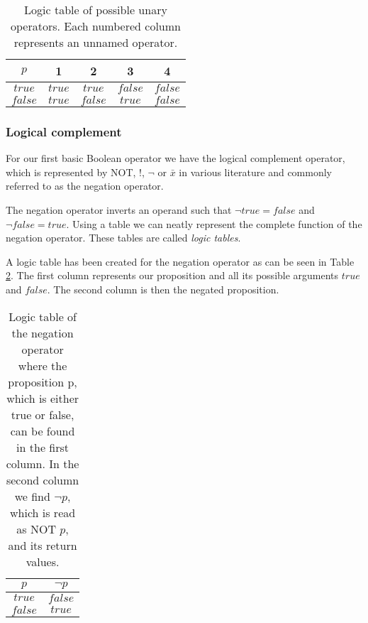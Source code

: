             \begin{table}[h!]
                \centering
                \begin{tabular}{|c||c|c|c|c|}
                	\hline
                	  $p$   &   1    &    2    &    3    & 4       \\ \hline
                	$true$  & $true$ & $true$  & $false$ & $false$ \\ \hline
                	$false$ & $true$ & $false$ & $true$  & $false$ \\ \hline
                \end{tabular}
                \caption{Logic table of possible unary operators. Each numbered column represents an unnamed operator.}
                \label{LogicTable:unary}
            \end{table} 
        
            \subsubsection{Logical complement}
            
                For our first basic Boolean operator we have the logical complement operator, which is represented by NOT, !, $\neg$ or $\bar{x}$ in various literature and commonly referred to as the negation operator. 
                
                The negation operator inverts an operand such that $\neg true = false$ and $\neg false = true$.
                Using a table we can neatly represent the complete function of the negation operator. These tables are called \textit{logic tables}.
                
                A logic table has been created for the negation operator as can be seen in Table \ref{LogicTable:Negation}.  The first column represents our proposition and all its possible arguments $true$ and $false$. The second column is then the negated proposition.
                
                \begin{table}[h!]
                    \centering
                    \begin{tabular}{|c|c|}
                    	\hline
                    	  $p$   & $\neg{p}$ \\ \hline
                    	$true$  &  $false$  \\ \hline
                    	$false$ &  $true$   \\ \hline
                    \end{tabular}
                    \caption{Logic table of the negation operator where the proposition p, which is either true or false, can be found in the first column. In the second column we find $\neg p$, which is read as NOT $p$, and its return values.}
                    \label{LogicTable:Negation}
                \end{table}
            
